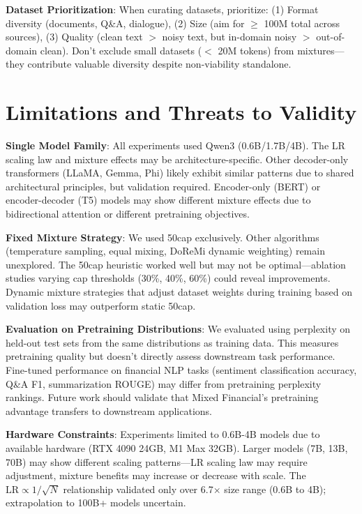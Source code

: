\textbf{Dataset Prioritization}: When curating datasets, prioritize: (1) Format diversity (documents, Q\&A, dialogue), (2) Size (aim for $\geq$ 100M total across sources), (3) Quality (clean text $>$ noisy text, but in-domain noisy $>$ out-of-domain clean). Don't exclude small datasets ($<$ 20M tokens) from mixtures—they contribute valuable diversity despite non-viability standalone.

\section{Limitations and Threats to Validity}

\textbf{Single Model Family}: All experiments used Qwen3 (0.6B/1.7B/4B). The LR scaling law and mixture effects may be architecture-specific. Other decoder-only transformers (LLaMA, Gemma, Phi) likely exhibit similar patterns due to shared architectural principles, but validation required. Encoder-only (BERT) or encoder-decoder (T5) models may show different mixture effects due to bidirectional attention or different pretraining objectives.

\textbf{Fixed Mixture Strategy}: We used 50cap exclusively. Other algorithms (temperature sampling, equal mixing, DoReMi dynamic weighting) remain unexplored. The 50cap heuristic worked well but may not be optimal—ablation studies varying cap thresholds (30\%, 40\%, 60\%) could reveal improvements. Dynamic mixture strategies that adjust dataset weights during training based on validation loss may outperform static 50cap.

\textbf{Evaluation on Pretraining Distributions}: We evaluated using perplexity on held-out test sets from the same distributions as training data. This measures pretraining quality but doesn't directly assess downstream task performance. Fine-tuned performance on financial NLP tasks (sentiment classification accuracy, Q\&A F1, summarization ROUGE) may differ from pretraining perplexity rankings. Future work should validate that Mixed Financial's pretraining advantage transfers to downstream applications.

\textbf{Hardware Constraints}: Experiments limited to 0.6B-4B models due to available hardware (RTX 4090 24GB, M1 Max 32GB). Larger models (7B, 13B, 70B) may show different scaling patterns—LR scaling law may require adjustment, mixture benefits may increase or decrease with scale. The $\text{LR} \propto 1/\sqrt{N}$ relationship validated only over 6.7$\times$ size range (0.6B to 4B); extrapolation to 100B+ models uncertain.

